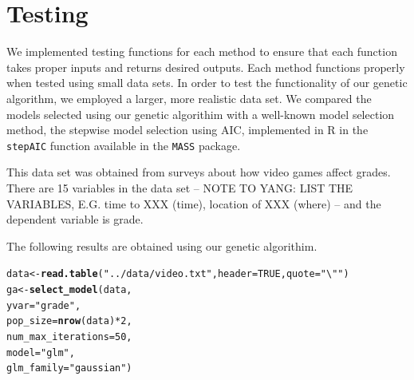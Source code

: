 \documentclass{article}\usepackage[]{graphicx}\usepackage[]{color}
\makeatletter
\newcommand{\hlnum}[1]{\textcolor[rgb]{0.686,0.059,0.569}{#1}}%
\newcommand{\hlstr}[1]{\textcolor[rgb]{0.192,0.494,0.8}{#1}}%
\newcommand{\hlopt}[1]{\textcolor[rgb]{0,0,0}{#1}}%
\newcommand{\hlstd}[1]{\textcolor[rgb]{0.345,0.345,0.345}{#1}}%
\newcommand{\hlkwb}[1]{\textcolor[rgb]{0.69,0.353,0.396}{#1}}%
\newcommand{\hlkwc}[1]{\textcolor[rgb]{0.333,0.667,0.333}{#1}}%
\newcommand{\hlkwd}[1]{\textcolor[rgb]{0.737,0.353,0.396}{\textbf{#1}}}%
\newenvironment{kframe}{%
 \def\at@end@of@kframe{}%
 \ifinner\ifhmode%
  \def\at@end@of@kframe{\end{minipage}}%
  \begin{minipage}{\columnwidth}%
 \fi\fi%
 \def\FrameCommand##1{\hskip\@totalleftmargin \hskip-\fboxsep
 \colorbox{shadecolor}{##1}\hskip-\fboxsep
     \hskip-\linewidth \hskip-\@totalleftmargin \hskip\columnwidth}%
 \MakeFramed {\advance\hsize-\width
   \@totalleftmargin\z@ \linewidth\hsize
   \@setminipage}}%
 {\par\unskip\endMakeFramed%
 \at@end@of@kframe}
\newenvironment{knitrout}{}{} %
\makeatother
\begin{document}
\section{Testing}
We implemented testing functions for each method to ensure that each 
function takes proper inputs and returns desired outputs. Each method 
functions properly when tested using small data sets. In order to test the 
functionality of our genetic algorithm, we employed a larger, more realistic 
data set. We compared the models selected using our genetic algorithim with a 
well-known model selection method, the stepwise model selection using AIC, 
implemented in R in the \texttt{stepAIC} function available in the 
\texttt{MASS} package.

This data set was obtained from surveys about how video games 
affect grades. There are 15 variables in the data set --
NOTE TO YANG: LIST THE VARIABLES, E.G. time to XXX (time),
location of XXX (where)
-- and the dependent variable is grade.

The following results are obtained using our genetic algorithim.

\begin{knitrout}
\color{fgcolor}\begin{kframe}
\begin{alltt}
\hlstd{data} \hlkwb{<-} \hlkwd{read.table}\hlstd{(}\hlstr{"../data/video.txt"}\hlstd{,} \hlkwc{header} \hlstd{=} \hlnum{TRUE}\hlstd{,} \hlkwc{quote} \hlstd{=} \hlstr{"\textbackslash{}""}\hlstd{)}
\hlstd{ga} \hlkwb{<-} \hlkwd{select_model}\hlstd{(data,}
                   \hlkwc{yvar} \hlstd{=} \hlstr{"grade"}\hlstd{,}
                   \hlkwc{pop_size} \hlstd{=} \hlkwd{nrow}\hlstd{(data)}\hlopt{*}\hlnum{2}\hlstd{,}
                   \hlkwc{num_max_iterations} \hlstd{=} \hlnum{50}\hlstd{,}
                   \hlkwc{model} \hlstd{=} \hlstr{"glm"}\hlstd{,}
                   \hlkwc{glm_family} \hlstd{=} \hlstr{"gaussian"}\hlstd{)}
\end{alltt}
\end{kframe}
\end{knitrout}
\end{document}
